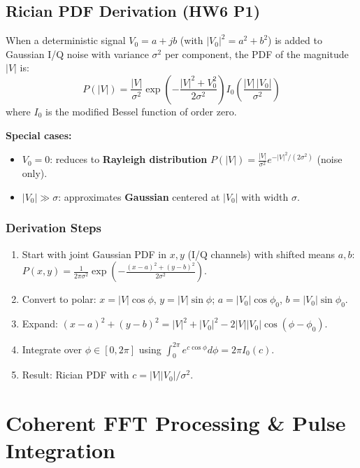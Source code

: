 \documentclass[10pt,letterpaper]{article}
\begin{document}
\subsection{Rician PDF Derivation (HW6 P1)}

\begin{tcolorbox}[formulabox, title={Rician Distribution}]
When a deterministic signal $V_0 = a+jb$ (with $|V_0|^2 = a^2+b^2$) is added to Gaussian I/Q noise with variance $\sigma^2$ per component, the PDF of the magnitude $|V|$ is:
\begin{equation}
  P(|V|) = \frac{|V|}{\sigma^2}\exp\!\left(-\frac{|V|^2+V_0^2}{2\sigma^2}\right)I_0\!\left(\frac{|V|\,|V_0|}{\sigma^2}\right)
\end{equation}
where $I_0$ is the modified Bessel function of order zero.

\textbf{Special cases:}
\begin{itemize}[noitemsep]
  \item $V_0 = 0$: reduces to \textbf{Rayleigh distribution} $P(|V|) = \frac{|V|}{\sigma^2}e^{-|V|^2/(2\sigma^2)}$ (noise only).
  \item $|V_0|\gg\sigma$: approximates \textbf{Gaussian} centered at $|V_0|$ with width $\sigma$.
\end{itemize}
\end{tcolorbox}

\subsubsection{Derivation Steps}
\begin{enumerate}[noitemsep]
  \item Start with joint Gaussian PDF in $x,y$ (I/Q channels) with shifted means $a,b$: $P(x,y) = \frac{1}{2\pi\sigma^2}\exp\!\left(-\frac{(x-a)^2+(y-b)^2}{2\sigma^2}\right)$.
  \item Convert to polar: $x = |V|\cos\phi$, $y = |V|\sin\phi$; $a = |V_0|\cos\phi_0$, $b = |V_0|\sin\phi_0$.
  \item Expand: $(x-a)^2+(y-b)^2 = |V|^2+|V_0|^2 - 2|V||V_0|\cos(\phi-\phi_0)$.
  \item Integrate over $\phi\in[0,2\pi]$ using $\int_0^{2\pi}e^{c\cos\phi}d\phi = 2\pi I_0(c)$.
  \item Result: Rician PDF with $c = |V||V_0|/\sigma^2$.
\end{enumerate}

\section{Coherent FFT Processing \& Pulse Integration}
\end{document}
